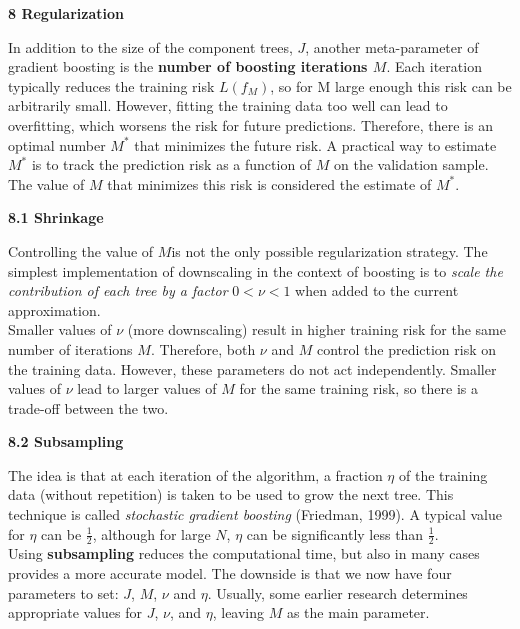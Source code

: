 \documentclass[12pt, letterpaper, twoside]{article}
\begin{document}
\begin{center}
\textbf{\large{8 Regularization}\\}
\end{center}
\hspace*{4ex} In addition to the size of the component trees, $J$, another meta-parameter of gradient boosting is the \textbf{number of boosting iterations $M$}. Each iteration typically reduces the training risk $L(f_M)$, so for M large enough this risk can be arbitrarily small. However, fitting the training data too well can lead to overfitting, which worsens the risk for future predictions. Therefore, there is an optimal number $M^*$ that minimizes the future risk. A practical way to estimate $M^*$ is to track the prediction risk as a function of $M$ on the validation sample. The value of $M$ that minimizes this risk is considered the estimate of $M^*$.\\
\begin{center}
\textbf{\large{8.1 Shrinkage}\\}
\end{center}
\hspace*{4ex} Controlling the value of $M $is not the only possible regularization strategy. The simplest implementation of downscaling in the context of boosting is to \emph{scale the contribution of each tree by a factor} $0 < \nu < 1$ when added to the current approximation.\\
\hspace*{4ex}Smaller values of $\nu$ (more downscaling) result in higher training risk for the same number of iterations $M$. Therefore, both $\nu$ and $M$ control the prediction risk on the training data. However, these parameters do not act independently. Smaller values of $\nu$ lead to larger values of $M$ for the same training risk, so there is a trade-off between the two.
\begin{center}
\textbf{\large{8.2 Subsampling}}
\end{center}
\hspace*{4ex}The idea is that at each iteration of the algorithm, a fraction $\eta$ of the training data (without repetition) is taken to be used to grow the next tree. This technique is called \emph{stochastic gradient boosting} (Friedman, 1999). A typical value for $\eta$ can be $\frac{1}{2}$, although for large $N$, $\eta$ can be significantly less than $\frac{1}{2}$.\\
\hspace*{4ex}Using \textbf{subsampling} reduces the computational time, but also in many cases provides a more accurate model. The downside is that we now have four parameters to set: $J$, $M$, $\nu$ and $\eta$. Usually, some earlier research determines appropriate values for $J$, $\nu$, and $\eta$, leaving $M$ as the main parameter.
\end{document}
